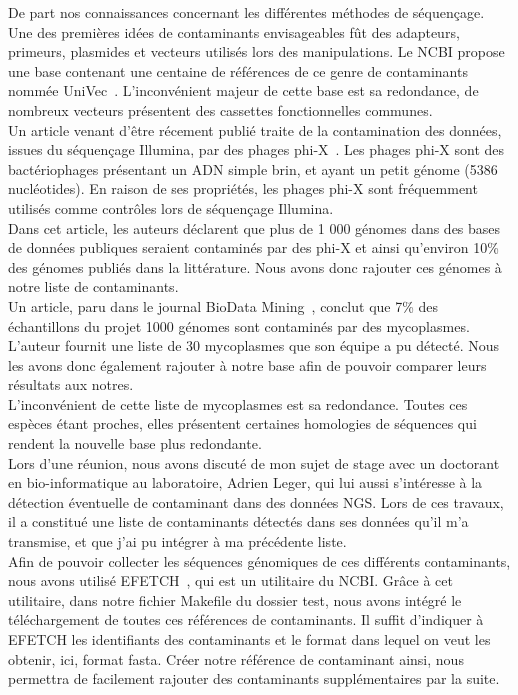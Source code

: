 \documentclass[a4paper,12pt]{article}
\begin{document}
De part nos connaissances concernant les différentes méthodes de séquençage. Une des premières idées de contaminants envisageables fût des adapteurs, primeurs, plasmides et vecteurs utilisés lors des manipulations. Le NCBI propose une base contenant une centaine de références de ce genre de contaminants nommée UniVec~\cite{UniVec}. L'inconvénient majeur de cette base est sa redondance, de nombreux vecteurs présentent des cassettes fonctionnelles communes.\\

Un article venant d'être récement publié traite de la contamination des données, issues du séquençage Illumina, par des phages phi-X~\cite{phiX}. Les phages phi-X sont des bactériophages présentant un ADN simple brin, et ayant un petit génome (5386 nucléotides). En raison de ses propriétés, les phages phi-X sont fréquemment utilisés comme contrôles lors de séquençage Illumina. \\ 
Dans cet article, les auteurs déclarent que plus de 1 000 génomes dans des bases de données publiques seraient contaminés par des phi-X et ainsi qu'environ 10\% des génomes publiés dans la littérature. Nous avons donc rajouter ces génomes à notre liste de contaminants.\\

Un article, paru dans le journal BioData Mining~\cite{mycoplasme}, conclut que 7\% des échantillons du projet 1000 génomes sont contaminés par des mycoplasmes. L'auteur fournit une liste de 30 mycoplasmes que son équipe a pu détecté. Nous les avons donc également rajouter à notre base afin de pouvoir comparer leurs résultats aux notres.\\ 
L'inconvénient de cette liste de mycoplasmes est sa redondance. Toutes ces espèces étant proches, elles présentent certaines homologies de séquences qui rendent la nouvelle base plus redondante. \\

Lors d'une réunion, nous avons discuté de mon sujet de stage avec un doctorant en bio-informatique au laboratoire, Adrien Leger, qui lui aussi s'intéresse à la détection éventuelle de contaminant dans des données NGS. Lors de ces travaux, il a constitué une liste de contaminants détectés dans ses données qu'il m'a transmise, et que j'ai pu intégrer à ma précédente liste.\\

Afin de pouvoir collecter les séquences génomiques de ces différents contaminants, nous avons utilisé EFETCH~\cite{efetch}, qui est un utilitaire du NCBI. Grâce à cet utilitaire, dans notre fichier Makefile du dossier test, nous avons intégré le téléchargement de toutes ces références de contaminants. Il suffit d'indiquer à EFETCH les identifiants des contaminants et le format dans lequel on veut les obtenir, ici, format fasta. Créer notre référence de contaminant ainsi, nous  permettra de facilement rajouter des contaminants supplémentaires par la suite. 
\end{document}
